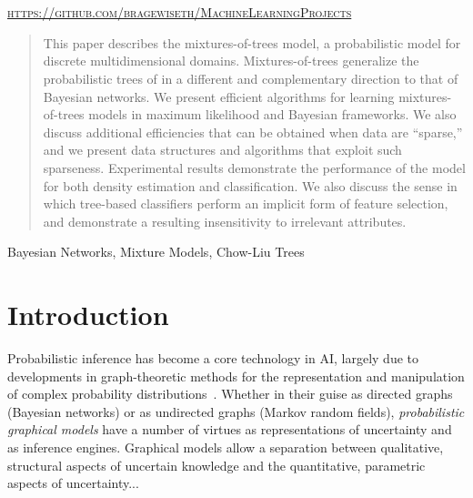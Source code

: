 \documentclass[twoside,11pt]{report}
\begin{document}
\begin{titlepage}
\begin{minipage}{0.4\textwidth}
	\end{minipage}\\[2 cm]
	\@date\\
    \vspace*{25mm}
    \textsc{\url{https://github.com/bragewiseth/MachineLearningProjects}}
	
	
    
    
    
    
	
\end{titlepage}
\nocite{*}
\newpage
\tableofcontents
\newpage

\begin{abstract}%
\lettrine{T}{}his paper describes the mixtures-of-trees model, a probabilistic 
model for discrete multidimensional domains.  Mixtures-of-trees 
generalize the probabilistic trees of 
in a different and complementary direction to that of Bayesian networks.
We present efficient algorithms for learning mixtures-of-trees 
models in maximum likelihood and Bayesian frameworks. 
We also discuss additional efficiencies that can be
obtained when data are ``sparse,'' and we present data 
structures and algorithms that exploit such sparseness.
Experimental results demonstrate the performance of the 
model for both density estimation and classification. 
We also discuss the sense in which tree-based classifiers
perform an implicit form of feature selection, and demonstrate
a resulting insensitivity to irrelevant attributes.
\end{abstract}

\begin{keywords}
  Bayesian Networks, Mixture Models, Chow-Liu Trees
\end{keywords}

\section{Introduction}

Probabilistic inference has become a core technology in AI,
largely due to developments in graph-theoretic methods for the 
representation and manipulation of complex probability 
distributions~.  Whether in their guise as 
\cite{Goodfellow-et-al-2016}
directed graphs (Bayesian networks) or as undirected graphs (Markov 
random fields), \emph{probabilistic graphical models} have a number 
of virtues as representations of uncertainty and as inference engines.  
Graphical models allow a separation between qualitative, structural
aspects of uncertain knowledge and the quantitative, parametric aspects 
of uncertainty...\\
\end{document}

